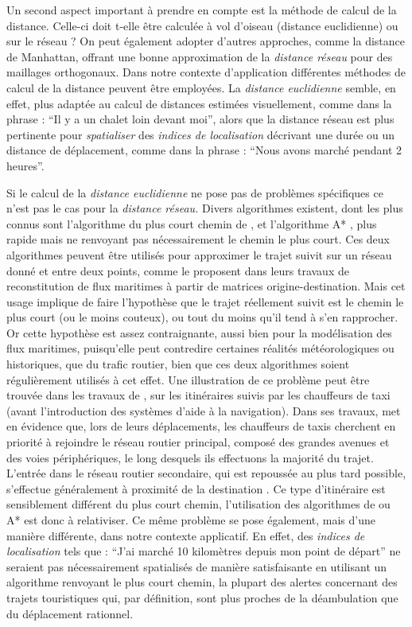 Un second aspect important à prendre en compte est la méthode de
calcul de la distance. Celle-ci doit t-elle être calculée à vol
d'oiseau (\ie distance euclidienne) ou sur le réseau ? On peut
également adopter d'autres approches, comme la distance de Manhattan,
offrant une bonne approximation de la \emph{distance réseau} pour des
maillages orthogonaux. Dans notre contexte d’application différentes
méthodes de calcul de la distance peuvent être employées. La
\emph{distance euclidienne} semble, en effet, plus adaptée au calcul
de distances estimées visuellement, comme dans la phrase : \enquote{Il
  y a un chalet loin devant moi}, alors que la distance réseau est
plus pertinente pour \emph{spatialiser} des \emph{indices de
  localisation} décrivant une durée ou un distance de déplacement,
comme dans la phrase : \enquote{Nous avons marché pendant 2 heures}.

Si le calcul de la \emph{distance euclidienne} ne pose pas de
problèmes spécifiques ce n'est pas le cas pour la \emph{distance
  réseau.}  Divers algorithmes existent, dont les plus connus sont
l'algorithme du plus court chemin de \textcite{Dijkstra1959}, et
l'algorithme A* \autocite{Hart1968}, plus rapide mais ne renvoyant pas
nécessairement le chemin le plus court. Ces deux algorithmes peuvent
être utilisés pour approximer le trajet suivit sur un réseau donné et
entre deux points, comme le proposent \textcite{Berli2018, Bunel2018}
dans leurs travaux de reconstitution de flux maritimes à partir de
matrices origine-destination. Mais cet usage implique de faire
l'hypothèse que le trajet réellement suivit est le chemin le plus
court (ou le moins couteux), ou tout du moins qu'il tend à s'en
rapprocher. Or cette hypothèse est assez contraignante, aussi bien
pour la modélisation des flux maritimes, puisqu'elle peut contredire
certaines réalités météorologiques ou historiques, que du trafic
routier, bien que ces deux algorithmes soient régulièrement utilisés à
cet effet. Une illustration de ce problème peut être trouvée dans les
travaux de \textcite{Pailhous1970}, sur les itinéraires suivis par les
chauffeurs de taxi (avant l'introduction des systèmes d'aide à la
navigation). Dans ses travaux, \textcite{Pailhous1970} met en évidence
que, lors de leurs déplacements, les chauffeurs de taxis cherchent en
priorité à rejoindre le réseau routier principal, composé des grandes
avenues et des voies périphériques, le long desquels ils effectuons la
majorité du trajet. L'entrée dans le réseau routier secondaire, qui
est repoussée au plus tard possible, s'effectue généralement à
proximité de la destination \autocite{Lagesse2016}. Ce type
d'itinéraire est sensiblement différent du plus court chemin,
l'utilisation des algorithmes de \textcite{Dijkstra1959} ou A*
\autocite{Hart1968} est donc à relativiser. Ce même problème se pose
également, mais d'une manière différente, dans notre contexte
applicatif. En effet, des \emph{indices de localisation} tels que :
\enquote{J'ai marché 10 kilomètres depuis mon point de départ} ne
seraient pas nécessairement spatialisés de manière satisfaisante en
utilisant un algorithme renvoyant le plus court chemin, la plupart des
alertes concernant des trajets touristiques qui, par définition, sont
plus proches de la déambulation que du déplacement rationnel.

